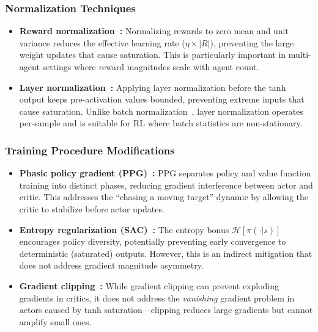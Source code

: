 \subsubsection{Normalization Techniques}

\begin{itemize}
    \item \textbf{Reward normalization~\cite{henderson2018deep}:} Normalizing rewards to zero mean and unit variance reduces the effective learning rate ($\eta \times |R|$), preventing the large weight updates that cause saturation. This is particularly important in multi-agent settings where reward magnitudes scale with agent count.

    \item \textbf{Layer normalization~\cite{ba2016layer}:} Applying layer normalization before the tanh output keeps pre-activation values bounded, preventing extreme inputs that cause saturation. Unlike batch normalization~\cite{ioffe2015batch}, layer normalization operates per-sample and is suitable for RL where batch statistics are non-stationary.
\end{itemize}

\subsubsection{Training Procedure Modifications}

\begin{itemize}
    \item \textbf{Phasic policy gradient (PPG)~\cite{cobbe2021phasic}:} PPG separates policy and value function training into distinct phases, reducing gradient interference between actor and critic. This addresses the ``chasing a moving target'' dynamic by allowing the critic to stabilize before actor updates.

    \item \textbf{Entropy regularization (SAC)~\cite{haarnoja2018soft}:} The entropy bonus $\mathcal{H}[\pi(\cdot|s)]$ encourages policy diversity, potentially preventing early convergence to deterministic (saturated) outputs. However, this is an indirect mitigation that does not address gradient magnitude asymmetry.

    \item \textbf{Gradient clipping~\cite{pascanu2013difficulty}:} While gradient clipping can prevent exploding gradients in critics, it does not address the \textit{vanishing} gradient problem in actors caused by tanh saturation---clipping reduces large gradients but cannot amplify small ones.
\end{itemize}


